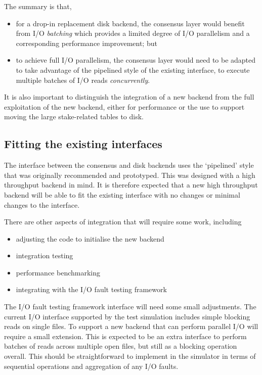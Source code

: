 \documentclass[11pt,a4paper]{article}
\begin{document}
The summary is that,
\begin{itemize}
\item for a drop-in replacement disk backend, the consensus layer would benefit
      from I/O \emph{batching} which provides a limited degree of I/O
      parallelism and a corresponding performance improvement; but
\item to achieve full I/O parallelism, the consensus layer would need to be
      adapted to take advantage of the pipelined style of the existing
      interface, to execute multiple batches of I/O reads \emph{concurrently}.
\end{itemize}

It is also important to distinguish the integration of a new backend from the
full exploitation of the new backend, either for performance or the use to
support moving the large stake-related tables to disk.

\subsection{Fitting the existing interfaces}
\label{sec:fitting-the-existing-interfaces}

The interface between the consensus and disk backends uses the `pipelined'
style that was originally recommended and prototyped. This was designed with
a high throughput backend in mind. It is therefore expected that a new high
throughput backend will be able to fit the existing interface with no changes
or minimal changes to the interface.

There are other aspects of integration that will require some work, including
\begin{itemize}
\item adjusting the code to initialise the new backend
\item integration testing
\item performance benchmarking
\item integrating with the I/O fault testing framework
\end{itemize}

The I/O fault testing framework interface will need some small adjustments.
The current I/O interface supported by the test simulation includes simple
blocking reads on single files. To support a new backend that can perform
parallel I/O will require a small extension. This is expected to be an extra
interface to perform batches of reads across multiple open files, but still as
a blocking operation overall. This should be straightforward to implement in
the simulator in terms of sequential operations and aggregation of any I/O
faults.
\end{document}
